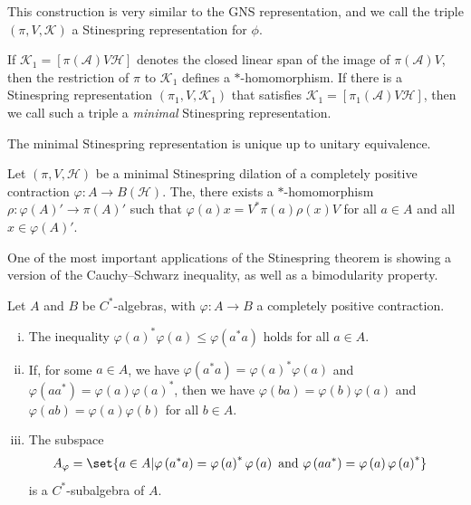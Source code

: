 \documentclass[10pt]{mypackage}
\begin{document}
This construction is very similar to the GNS representation, and we call the triple $\left( \pi,V,\mathcal{K} \right)$ a Stinespring representation for $\phi$.

If $\mathcal{K}_1 = \left[ \pi(\mathcal{A})V\mathcal{H} \right]$ denotes the closed linear span of the image of $\pi(\mathcal{A})V$, then the restriction of $\pi$ to $\mathcal{K}_1$ defines a $\ast$-homomorphism. If there is a Stinespring representation $\left( \pi_1,V,\mathcal{K}_1 \right)$ that satisfies $\mathcal{K}_1 = \left[ \pi_1\left( \mathcal{A} \right)V\mathcal{H} \right]$, then we call such a triple a \textit{minimal} Stinespring representation.

The minimal Stinespring representation is unique up to unitary equivalence.
\begin{proposition}
  Let $\left( \pi,V,\mathcal{H} \right)$ be a minimal Stinespring dilation of a completely positive contraction $\varphi\colon A\rightarrow B\left( \mathcal{H} \right)$. The, there exists a $\ast$-homomorphism $\rho\colon \varphi\left( A \right)'\rightarrow \pi\left( A \right)'$ such that $\varphi\left( a \right)x = V^{\ast}\pi(a)\rho(x)V$ for all $a\in A$ and all $x\in \varphi\left( A \right)'$.
\end{proposition}
One of the most important applications of the Stinespring theorem is showing a version of the Cauchy--Schwarz inequality, as well as a bimodularity property.
\begin{proposition}
  Let $A$ and $B$ be $C^{\ast}$-algebras, with $\varphi\colon A\rightarrow B$ a completely positive contraction.
  \begin{enumerate}[(i)]
    \item The inequality $\varphi\left( a \right)^{\ast}\varphi\left( a \right)\leq \varphi\left( a^{\ast}a \right)$ holds for all $a\in A$.
    \item If, for some $a\in A$, we have $\varphi\left( a^{\ast}a \right) = \varphi\left( a \right)^{\ast}\varphi\left( a \right)$ and $\varphi\left( aa^{\ast} \right) = \varphi\left( a \right)\varphi\left( a \right)^{\ast}$, then we have $\varphi\left( ba \right) = \varphi\left( b \right)\varphi\left( a \right)$ and $\varphi\left( ab \right) = \varphi\left( a \right)\varphi\left( b \right)$ for all $b\in A$.
    \item The subspace
      \begin{align*}
        A_{\varphi} &= \set{a\in A | \varphi\left( a^{\ast}a \right) = \varphi\left( a \right)^{\ast}\varphi\left( a \right)\text{ and }\varphi\left( aa^{\ast} \right) = \varphi\left( a \right)\varphi\left( a \right)^{\ast}}
      \end{align*}
      is a $C^{\ast}$-subalgebra of $A$.
  \end{enumerate}
\end{proposition}
\end{document}
